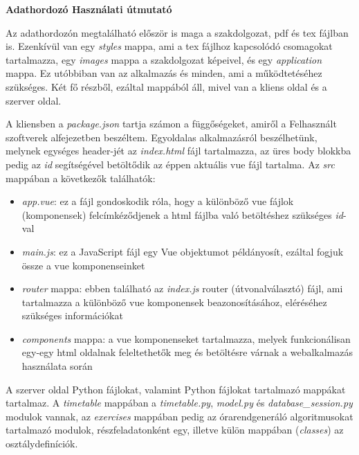 \pagestyle{empty}

\noindent \textbf{\Large Adathordozó Használati útmutató}

\vskip 1cm

Az adathordozón megtalálható először is maga a szakdolgozat, pdf és tex fájlban is. Ezenkívül van egy \textit{styles} mappa, ami a tex fájlhoz kapcsolódó csomagokat tartalmazza, egy \textit{images} mappa a szakdolgozat képeivel, és egy \textit{application} mappa. Ez utóbbiban van az alkalmazás és minden, ami a működtetéséhez szükséges. Két fő részből, ezáltal mappából áll, mivel van a kliens oldal és a szerver oldal.

A kliensben a \textit{package.json} tartja számon a függőségeket, amiről a Felhasznált szoftverek alfejezetben beszéltem. Egyoldalas alkalmazásról beszélhetünk, melynek egységes header-jét az \textit{index.html} fájl tartalmazza, az üres body blokkba pedig az \textit{id} segítségével betöltődik az éppen aktuális vue fájl tartalma. Az \textit{src} mappában a következők találhatók:

\begin{itemize} 
	\item \textit{app.vue}: ez a fájl gondoskodik róla, hogy a különböző vue fájlok (komponensek) felcímkéződjenek a html fájlba való betöltéshez szükséges \textit{id}-val
	\item \textit{main.js}: ez a JavaScript fájl egy Vue objektumot példányosít, ezáltal fogjuk össze a vue komponenseinket
	\item \textit{router} mappa: ebben található az \textit{index.js} router (útvonalválasztó) fájl, ami tartalmazza a különböző vue komponensek beazonosításához, eléréséhez szükséges információkat
	\item \textit{components} mappa: a vue komponenseket tartalmazza, melyek funkcionálisan egy-egy html oldalnak feleltethetők meg és betöltésre várnak a webalkalmazás használata során
\end{itemize}

A szerver oldal Python fájlokat, valamint Python fájlokat tartalmazó mappákat tartalmaz. A \textit{timetable} mappában a \textit{timetable.py}, \textit{model.py} és \textit{database\_session.py} modulok vannak, az \textit{exercises} mappában pedig az órarendgeneráló algoritmusokat tartalmazó modulok, részfeladatonként egy, illetve külön mappában (\textit{classes}) az osztálydefiníciók.

